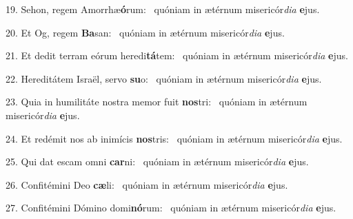19. Sehon, regem Amorrhæ\textbf{ó}rum: \ast\  quóniam in ætérnum misericór\textit{di}\textit{a} \textbf{e}jus.\

20. Et Og, regem \textbf{Ba}san: \ast\  quóniam in ætérnum misericór\textit{di}\textit{a} \textbf{e}jus.\

21. Et dedit terram eórum heredi\textbf{tá}tem: \ast\  quóniam in ætérnum misericór\textit{di}\textit{a} \textbf{e}jus.\

22. Hereditátem Israël, servo \textbf{su}o: \ast\  quóniam in ætérnum misericór\textit{di}\textit{a} \textbf{e}jus.\

23. Quia in humilitáte nostra memor fuit \textbf{nos}tri: \ast\  quóniam in ætérnum misericór\textit{di}\textit{a} \textbf{e}jus.\

24. Et redémit nos ab inimícis \textbf{nos}tris: \ast\  quóniam in ætérnum misericór\textit{di}\textit{a} \textbf{e}jus.\

25. Qui dat escam omni \textbf{car}ni: \ast\  quóniam in ætérnum misericór\textit{di}\textit{a} \textbf{e}jus.\

26. Confitémini Deo \textbf{cæ}li: \ast\  quóniam in ætérnum misericór\textit{di}\textit{a} \textbf{e}jus.\

27. Confitémini Dómino domi\textbf{nó}rum: \ast\  quóniam in ætérnum misericór\textit{di}\textit{a} \textbf{e}jus.\

